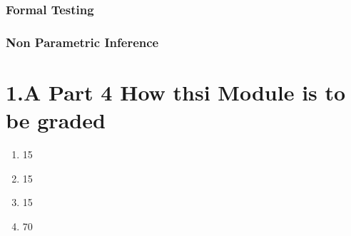 \subsubsection{Formal Testing}

\subsubsection{Non Parametric Inference}




\section{1.A Part 4 How thsi Module is to be graded}

\begin{enumerate}
\item 15%
\item 15%
\item 15%
\item 70%
\end{enumerate}
